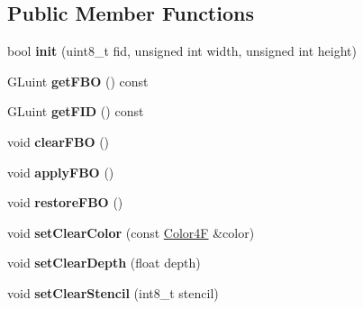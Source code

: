 \subsection*{Public Member Functions}
\begin{DoxyCompactItemize}
\item 
\mbox{\label{classexperimental_1_1FrameBuffer_ae87323f6ff0ee697b2a6ce36ee7afd9d}} 
bool {\bfseries init} (uint8\+\_\+t fid, unsigned int width, unsigned int height)
\item 
\mbox{\label{classexperimental_1_1FrameBuffer_a28aee9760be43b41399db60c8b5c5dd3}} 
G\+Luint {\bfseries get\+F\+BO} () const
\item 
\mbox{\label{classexperimental_1_1FrameBuffer_ad48dcb275981bbf64c5beae7123cd6c0}} 
G\+Luint {\bfseries get\+F\+ID} () const
\item 
\mbox{\label{classexperimental_1_1FrameBuffer_acbe94c3e0e67f0eb61ebf2093f0e8a8b}} 
void {\bfseries clear\+F\+BO} ()
\item 
\mbox{\label{classexperimental_1_1FrameBuffer_a48523e11d0a440736786fbab6b56a5f4}} 
void {\bfseries apply\+F\+BO} ()
\item 
\mbox{\label{classexperimental_1_1FrameBuffer_a11467053450de2da6d4b26104a6a569a}} 
void {\bfseries restore\+F\+BO} ()
\item 
\mbox{\label{classexperimental_1_1FrameBuffer_aa6a6446fabfdd36ebddfd3e9bcf3cd64}} 
void {\bfseries set\+Clear\+Color} (const \hyperlink{structColor4F}{Color4F} \&color)
\item 
\mbox{\label{classexperimental_1_1FrameBuffer_a024e094f5b92170c11495f87eed00ab1}} 
void {\bfseries set\+Clear\+Depth} (float depth)
\item 
\mbox{\label{classexperimental_1_1FrameBuffer_afb038661222d25d168eae886cb5e342d}} 
void {\bfseries set\+Clear\+Stencil} (int8\+\_\+t stencil)

\end{DoxyCompactItemize}
